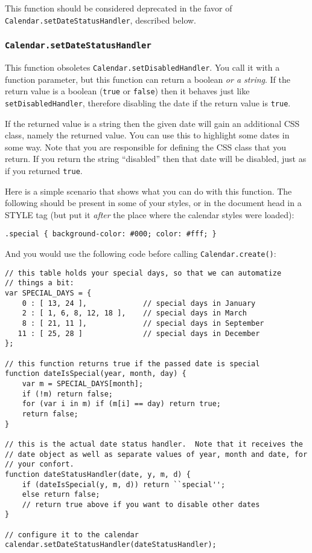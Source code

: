 \documentclass[a4paper,10pt]{article}
\begin{document}
This function should be considered deprecated in the favor of
\texttt{Calendar.setDateStatusHandler}, described below.

\subsubsection{\texttt{Calendar.setDateStatusHandler}}\label{sec:Calendar.setDateStatusHandler}

This function obsoletes \texttt{Calendar.setDisabledHandler}.  You call it with
a function parameter, but this function can return a boolean
\emph{or a string}.  If the return value is a boolean (\texttt{true} or
\texttt{false}) then it behaves just like \texttt{setDisabledHandler},
therefore disabling the date if the return value is \texttt{true}.

If the returned value is a string then the given date will gain an additional
CSS class, namely the returned value.  You can use this to highlight some dates
in some way.  Note that you are responsible for defining the CSS class that you
return.  If you return the string ``disabled'' then that date will be disabled,
just as if you returned \texttt{true}.

Here is a simple scenario that shows what you can do with this function.  The
following should be present in some of your styles, or in the document head in
a STYLE tag (but put it \emph{after} the place where the calendar styles were
loaded):

\begin{verbatim}
.special { background-color: #000; color: #fff; }
\end{verbatim}

And you would use the following code before calling \texttt{Calendar.create()}:

\begin{verbatim}
// this table holds your special days, so that we can automatize
// things a bit:
var SPECIAL_DAYS = {
    0 : [ 13, 24 ],             // special days in January
    2 : [ 1, 6, 8, 12, 18 ],    // special days in March
    8 : [ 21, 11 ],             // special days in September
   11 : [ 25, 28 ]              // special days in December
};

// this function returns true if the passed date is special
function dateIsSpecial(year, month, day) {
    var m = SPECIAL_DAYS[month];
    if (!m) return false;
    for (var i in m) if (m[i] == day) return true;
    return false;
}

// this is the actual date status handler.  Note that it receives the
// date object as well as separate values of year, month and date, for
// your confort.
function dateStatusHandler(date, y, m, d) {
    if (dateIsSpecial(y, m, d)) return ``special'';
    else return false;
    // return true above if you want to disable other dates
}

// configure it to the calendar
calendar.setDateStatusHandler(dateStatusHandler);
\end{verbatim}
\end{document}
